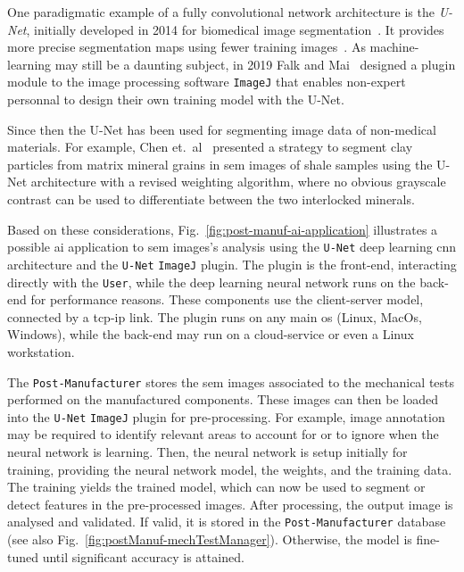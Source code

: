 One paradigmatic example of a fully convolutional network architecture is the
\emph{U-Net}, initially developed in 2014 for biomedical image
segmentation~\cite{Ronneberger2015UNet}. It provides more precise segmentation
maps using fewer training images~\cite{Ronneberger2015UNet}.
As machine-learning may still be a daunting subject, in 2019 Falk and Mai~\cite{Falk2019UNet}
designed a plugin module to the image processing software \texttt{ImageJ} that
enables non-expert personnal to design their own training model with the U-Net.

Since then the U-Net has been
used for segmenting image data of non-medical materials. For example, Chen
et.~al~\cite{chen2020DeepLearningSEM} presented a strategy to segment clay
particles from matrix mineral grains in \gls{sem} images of shale samples using
the U-Net architecture with a revised weighting algorithm, where no obvious grayscale contrast can be used to differentiate between the two interlocked minerals.

Based on these considerations, Fig.~\ref{fig:post-manuf-ai-application}
illustrates a possible \gls{ai} application to \gls{sem} images's analysis using
the \texttt{U-Net} deep learning \gls{cnn} architecture and the \texttt{U-Net}
\texttt{ImageJ} plugin. The plugin is the front-end, interacting directly with the \texttt{User}, while the deep learning
neural network runs on the back-end for performance reasons. These components
use the client-server model, connected by a \gls{tcp-ip} link. The plugin runs on
any main \gls{os} (Linux, MacOs, Windows), while the back-end may run on a
cloud-service or even a Linux workstation.

The \texttt{Post-Manufacturer} stores the \gls{sem}
images associated to the mechanical tests performed on the manufactured
components. These images can then be loaded into the \texttt{U-Net}
\texttt{ImageJ} plugin for pre-processing. For example, image annotation may be
required to identify relevant areas to account for or to ignore when the neural
network is learning. Then, the neural network is setup initially for training,
providing the neural network model, the weights, and the training data. The
training yields the trained model, which can now be used to segment or detect
features in the pre-processed images. After processing, the output image is
analysed and validated. If valid, it is stored in the \texttt{Post-Manufacturer}
database (see also Fig.~\ref{fig:postManuf-mechTestManager}). Otherwise, the model is fine-tuned until significant accuracy is
attained.

